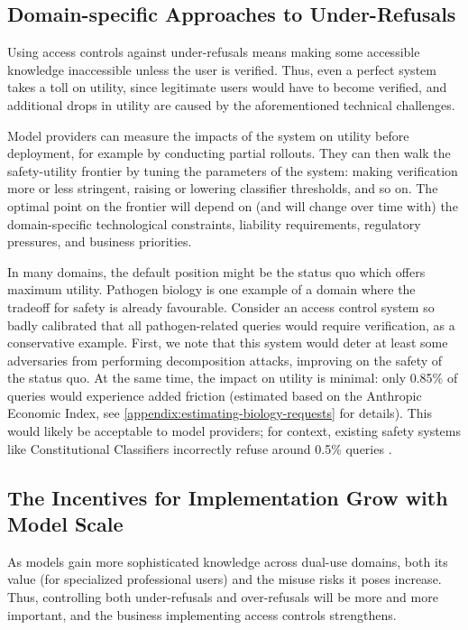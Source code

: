 \documentclass{article}
\theoremstyle{plain}
\theoremstyle{definition}
\theoremstyle{remark}
\begin{document}
\subsection{Domain-specific Approaches to Under-Refusals}

Using access controls against under-refusals means making some accessible knowledge inaccessible unless the user is verified.
Thus, even a perfect system takes a toll on utility, since legitimate users would have to become verified, and additional drops in utility are caused by the aforementioned technical challenges.

Model providers can measure the impacts of the system on utility before deployment, for example by conducting partial rollouts.
They can then walk the safety-utility frontier by tuning the parameters of the system: making verification more or less stringent, raising or lowering classifier thresholds, and so on.
The optimal point on the frontier will depend on (and will change over time with) the domain-specific technological constraints, liability requirements, regulatory pressures, and business priorities.

In many domains, the default position might be the status quo which offers maximum utility.
Pathogen biology is one example of a domain where the tradeoff for safety is already favourable.
Consider an access control system so badly calibrated that all pathogen-related queries would require verification, as a conservative example.
First, we note that this system would deter at least some adversaries from performing decomposition attacks, improving on the safety of the status quo.
At the same time, the impact on utility is minimal: only 0.85\% of queries would experience added friction (estimated based on the Anthropic Economic Index, see \cref{appendix:estimating-biology-requests} for details).
This would likely be acceptable to model providers; for context, existing safety systems like Constitutional Classifiers incorrectly refuse around 0.5\% queries \cite{sharma2025constitutionalclassifiersdefendinguniversal}.

\subsection{The Incentives for Implementation Grow with Model Scale}

As models gain more sophisticated knowledge across dual-use domains, both its value (for specialized professional users) and the misuse risks it poses increase.
Thus, controlling both under-refusals and over-refusals will be more and more important, and the business implementing access controls strengthens.
\end{document}
